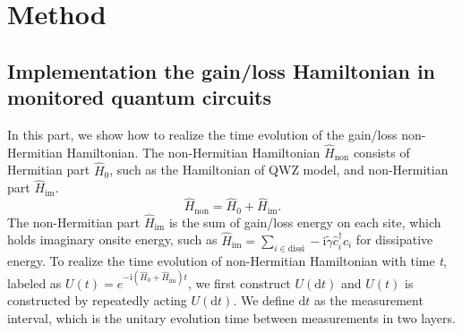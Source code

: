 \documentclass[longbibliography, aps, prx, amsmath, amssymb, amsfonts, twocolumn,superscriptaddress, footinbib]{revtex4-1}
\begin{document}
	\section{Method~\label{sec:method}}
	\subsection{Implementation the gain/loss Hamiltonian in monitored quantum circuits}

	In this part, we show how to realize the time evolution of the gain/loss non-Hermitian Hamiltonian. The non-Hermitian Hamiltonian $\hat{H}_{\text{non}}$ consists of Hermitian part $\hat{H}_0$, such as the Hamiltonian of QWZ model, and non-Hermitian part $\hat{H}_{\text{im}}$.
	\begin{equation}
		\hat{H}_{\text{non}} = \hat{H}_0 +\hat{H}_{\text{im}}. \label{eq:non-hermitian}
	\end{equation}
	The non-Hermitian part $\hat{H}_{\text{im}}$ is the sum of gain/loss energy on each site, which holds imaginary onsite energy, such as $\hat{H}_{\text{im}} = \sum_{i\in \text{dissi}} -\mathrm{i}\tilde{\gamma} \hat{c}_i^{\dagger} \hat{c}_i$ for dissipative energy. 
	To realize the time evolution of non-Hermitian Hamiltonian with time \textit{t}, labeled as $U(t) = e^{-\mathrm{i}(\hat{H}_0+\hat{H}_{\text{im}})t}$, we first construct $U(\mathrm{d} t)$ and  
	$U(t)$ is constructed by repeatedly acting $U(\mathrm{d} t)$.
	We define $\mathrm{d} t$ as the measurement interval, which is the unitary evolution time between measurements in two layers.
	
\end{document}
